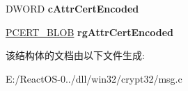 \begin{DoxyCompactItemize}
\item 
\mbox{\label{struct___c_m_s_g___s_i_g_n_e_d___e_n_c_o_d_e___i_n_f_o___w_i_t_h___c_m_s_a82cb53655d24f5c796f604fed2878414}} 
D\+W\+O\+RD {\bfseries c\+Attr\+Cert\+Encoded}
\item 
\mbox{\label{struct___c_m_s_g___s_i_g_n_e_d___e_n_c_o_d_e___i_n_f_o___w_i_t_h___c_m_s_ab2cdb6bf9082158c13f400bd3c7f32c1}} 
\hyperlink{struct___c_r_y_p_t_o_a_p_i___b_l_o_b}{P\+C\+E\+R\+T\+\_\+\+B\+L\+OB} {\bfseries rg\+Attr\+Cert\+Encoded}
\end{DoxyCompactItemize}


该结构体的文档由以下文件生成\+:\begin{DoxyCompactItemize}
\item 
E\+:/\+React\+O\+S-\/0../dll/win32/crypt32/msg.\+c\end{DoxyCompactItemize}
